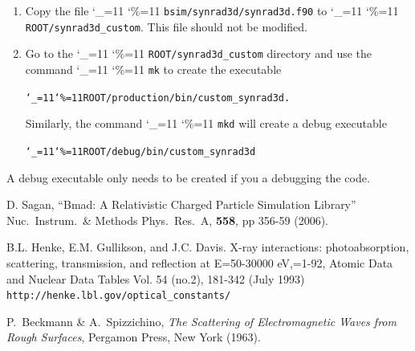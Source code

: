 \documentclass[11pt,openany]{report}
\newcommand{\sref}[1]{$\S$\ref{#1}}
\newcommand\ttcmd{\begingroup\catcode`\_=11 \catcode`\%=11 \dottcmd}
\newcommand\dottcmd[1]{\texttt{#1}\endgroup}
\newcommand{\vn}{\ttcmd}
\newlength{\ExBeg}
\newlength{\ExEnd}
\newenvironment{example}
  {\vspace{\ExBeg} \begin{alltt}}
  {\end{alltt} \vspace{\ExEnd}}
\begin{document}
{{{\begin{enumerate}
There are three files in the \vn{bsim/synrad3d/custom} directory. One file is a template file for 
creating custom code called
\begin{example}
  photon_init_custom.f90
\end{example}
There is documentation in this file on how to customize it. To have this custom routine called, the
\vn{photon_start_input_file} (\sref{s:master.example}) must be set to ``\vn{CUSTOM}''.

The other two files are CMake\footnote{CMake is a program used for
compiling code} script files which do not have to be modified. These files are
\begin{example}
  CMakeLists.txt
  cmake.custom_synrad3d
\end{example}
These scripts are setup to make an executable called \vn{custom_synrad3d}. This name can be changed
by modifying the \vn{cmake.custom_synrad3d} file.
  \item
Copy the file \vn{bsim/synrad3d/synrad3d.f90} to \vn{ROOT/synrad3d_custom}. This file should not
be modified.
  \item
Go to the \vn{ROOT/synrad3d_custom} directory and use the command \vn{mk} to create the
executable 
\begin{example}
    \vn{ROOT/production/bin/custom_synrad3d}. 
\end{example}
Similarly, the command \vn{mkd} will create a debug executable 
\begin{example}
    \vn{ROOT/debug/bin/custom_synrad3d}
\end{example}
	\end{enumerate}
A debug executable only needs to be created if you a debugging the code.

\begin{thebibliography}{9}

D. Sagan,
``Bmad: A Relativistic Charged Particle Simulation Library''
Nuc.\ Instrum.\ \& Methods Phys.\ Res.\ A, {\bf 558}, pp 356-59 (2006).

B.L. Henke, E.M. Gullikson, and J.C. Davis. X-ray
interactions: photoabsorption, scattering, transmission, and
reflection at E=50-30000 eV,=1-92, Atomic Data and Nuclear Data
Tables Vol. 54 (no.2), 181-342 (July 1993) {\tt
http://henke.lbl.gov/optical\_constants/}

P.~Beckmann \& A.~Spizzichino, \emph{The Scattering of Electromagnetic Waves
  from Rough Surfaces}, Pergamon Press, New York (1963).


\end{thebibliography}}}}
\end{document}
